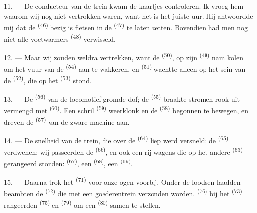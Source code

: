 11. --- De conducteur van de trein kwam de kaartjes controleren. Ik vroeg hem waarom wij nog
niet vertrokken waren, want het is het juiste uur. Hij antwoordde mij dat de
 \textsuperscript{(46)} bezig is fietsen in de 
\textsuperscript{(47)} te laten zetten. Bovendien had men nog niet alle voetwarmers
\textsuperscript{(48)} verwisseld.

12. --- Maar wij zouden weldra vertrekken, want de  \textsuperscript{(50)}, op
zijn  \textsuperscript{(49)} nam kolen om het vuur van de 
\textsuperscript{(54)} aan te wakkeren, en
 \textsuperscript{(51)} wachtte alleen op het sein van de
 \textsuperscript{(52)}, die op het 
\textsuperscript{(53)} stond.

13. --- De  \textsuperscript{(56)} van de locomotief gromde dof; de
 \textsuperscript{(55)} braakte stromen rook uit vermengd met
 \textsuperscript{(60)}. Een schril 
\textsuperscript{(59)} weerklonk en de  \textsuperscript{(58)} begonnen te
bewegen, en dreven de  \textsuperscript{(57)} van de zware machine aan.

\VUsaut{3.0mm}
\VUsaut{3.0mm}

14. --- De snelheid van de trein, die over de  \textsuperscript{(64)} liep werd
versneld; de  \textsuperscript{(65)} verdwenen; wij passeerden de
 \textsuperscript{(66)}, en ook een rij wagens die op het andere
 \textsuperscript{(63)} gerangeerd stonden: 
\textsuperscript{(67)}, een  \textsuperscript{(68)}, een
 \textsuperscript{(69)}.


15. --- Daarna trok het  \textsuperscript{(71)} voor onze ogen
voorbij. Onder de loodsen laadden beambten de  \textsuperscript{(72)} die met
een goederentrein verzonden worden.
 \textsuperscript{(76)} bij het 
\textsuperscript{(73)} rangeerden  \textsuperscript{(75)} en
 \textsuperscript{(79)} om een 
\textsuperscript{(80)} samen te stellen.

